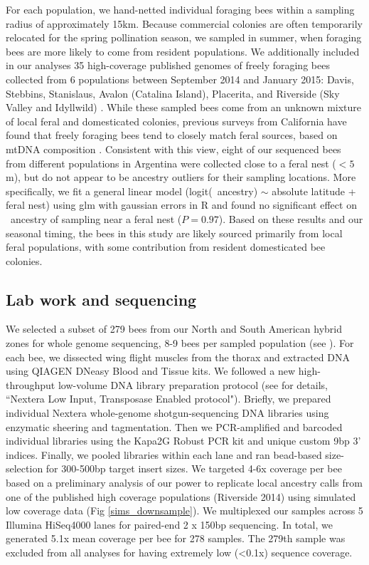 For each population, we hand-netted individual foraging bees within a sampling radius of approximately 15km. Because commercial colonies are often temporarily relocated for the spring pollination season, we sampled in summer, when foraging bees are more likely to come from resident populations. We additionally included in our analyses 35 high-coverage published genomes of freely foraging bees collected from 6 populations between September 2014 and January 2015: Davis, Stebbins, Stanislaus, Avalon (Catalina Island), Placerita, and Riverside (Sky Valley and Idyllwild) \cite{Cridland:2018fx}.
While these sampled bees come from an unknown mixture of local feral and domesticated colonies, previous surveys from California have found that freely foraging bees tend to closely match feral sources, based on mtDNA composition \cite{Kono:2015fi}. Consistent with this view, eight of our sequenced bees from different populations in Argentina were collected close to a feral nest ($<5$m), but do not appear to be ancestry outliers for their sampling locations. More specifically, we fit a general linear model (logit(\A\ ancestry) $\sim$ absolute latitude + feral nest) using glm with gaussian errors in R and found no significant effect on \A\ ancestry of sampling near a feral nest ($P = 0.97$). Based on these results and our seasonal timing, the bees in this study are likely sourced primarily from local feral populations, with some contribution from resident domesticated bee colonies.

\subsection*{Lab work and sequencing}
We selected a subset of 279 bees from our North and South American hybrid zones for whole genome sequencing, 8-9 bees per sampled population (see ). For each bee, we dissected wing flight muscles from the thorax and extracted DNA using QIAGEN DNeasy Blood and Tissue kits. We followed a new high-throughput low-volume DNA library preparation protocol (see \cite{Rowan:2019ca} for details, “Nextera Low Input, Transposase Enabled protocol"). Briefly, we prepared individual Nextera whole-genome shotgun-sequencing DNA libraries using enzymatic sheering and tagmentation. Then we PCR-amplified and barcoded individual libraries using the Kapa2G Robust PCR kit and unique custom 9bp 3’ indices. Finally, we pooled libraries within each lane and ran bead-based size-selection for 300-500bp target insert sizes. We targeted 4-6x coverage per bee based on a preliminary analysis of our power to replicate local ancestry calls from one of the published high coverage populations (Riverside 2014) using simulated low coverage data (Fig \ref{sims_downsample}). We multiplexed our samples across 5 Illumina HiSeq4000 lanes for paired-end 2 x 150bp sequencing. In total, we generated 5.1x mean coverage per bee for 278 samples. The 279th sample was excluded from all analyses for having extremely low (\textless 0.1x) sequence coverage.

